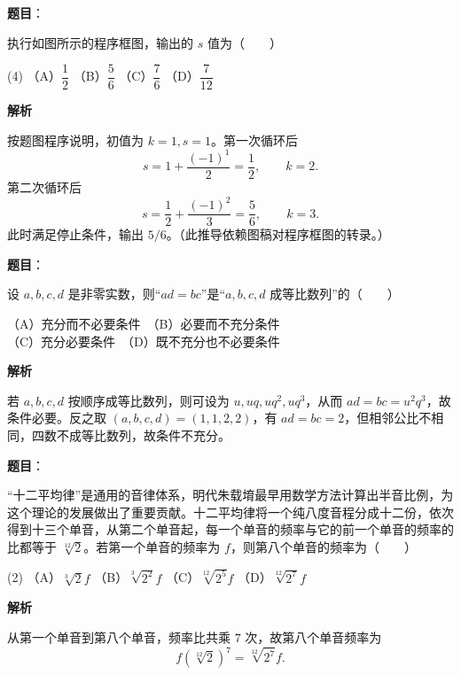 \begin{answer}

\textbf{题目}：

执行如图所示的程序框图，输出的 $s$ 值为\mbox{（　　）}
\nopagebreak[4]
\begin{center}\end{center}
\nopagebreak[4]
\begin{gkopts}(4)
\task （A）$\dfrac12$
\task （B）$\dfrac56$
\task （C）$\dfrac76$
\task （D）$\dfrac7{12}$
\end{gkopts}

\textbf{解析}

按题图程序说明，初值为 $k=1,s=1$。第一次循环后
\nopagebreak[4]
\[
s=1+\frac{(-1)^1}{2}=\frac12,\qquad k=2.
\]
第二次循环后
\nopagebreak[4]
\[
s=\frac12+\frac{(-1)^2}{3}=\frac56,\qquad k=3.
\]
此时满足停止条件，输出 $5/6$。（此推导依赖图稿对程序框图的转录。）


\end{answer}
\begin{answer}

\textbf{题目}：

设 $a,b,c,d$ 是非零实数，则“$ad=bc$”是“$a,b,c,d$ 成等比数列”的\mbox{（　　）}

（A）充分而不必要条件　（B）必要而不充分条件\\
（C）充分必要条件　（D）既不充分也不必要条件

\textbf{解析}

若 $a,b,c,d$ 按顺序成等比数列，则可设为 $u,uq,uq^2,uq^3$，从而 $ad=bc=u^2q^3$，故条件必要。反之取 $(a,b,c,d)=(1,1,2,2)$，有 $ad=bc=2$，但相邻公比不相同，四数不成等比数列，故条件不充分。


\end{answer}
\begin{answer}

\textbf{题目}：

“十二平均律”是通用的音律体系，明代朱载堉最早用数学方法计算出半音比例，为这个理论的发展做出了重要贡献。十二平均律将一个纯八度音程分成十二份，依次得到十三个单音，从第二个单音起，每一个单音的频率与它的前一个单音的频率的比都等于 $\sqrt[12]{2}$。若第一个单音的频率为 $f$，则第八个单音的频率为\mbox{（　　）}

\begin{gkopts}(2)
\task （A）$\sqrt[3]{2}f$
\task （B）$\sqrt[3]{2^2}f$
\task （C）$\sqrt[12]{2^5}f$
\task （D）$\sqrt[12]{2^7}f$
\end{gkopts}

\textbf{解析}

从第一个单音到第八个单音，频率比共乘 $7$ 次，故第八个单音频率为
\nopagebreak[4]
\[
f\left(\sqrt[12]2\right)^7=\sqrt[12]{2^7}f.
\]


\end{answer}

